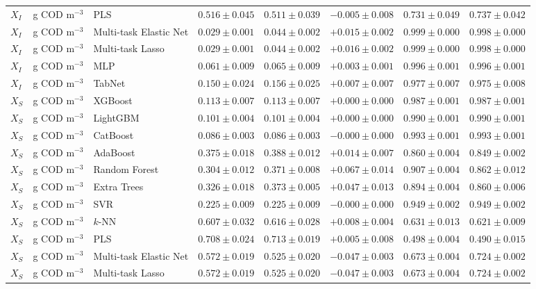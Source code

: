 \begin{longtable}{llp{3.1cm}rrrrr}
$X_{I}$ & g COD m$^{-3}$ & PLS & $0.516\pm0.045$ & $0.511\pm0.039$ & $-0.005\pm0.008$ & $0.731\pm0.049$ & $0.737\pm0.042$ \\
$X_{I}$ & g COD m$^{-3}$ & Multi-task Elastic Net & $0.029\pm0.001$ & $0.044\pm0.002$ & $+0.015\pm0.002$ & $0.999\pm0.000$ & $0.998\pm0.000$ \\
$X_{I}$ & g COD m$^{-3}$ & Multi-task Lasso & $0.029\pm0.001$ & $0.044\pm0.002$ & $+0.016\pm0.002$ & $0.999\pm0.000$ & $0.998\pm0.000$ \\
$X_{I}$ & g COD m$^{-3}$ & MLP & $0.061\pm0.009$ & $0.065\pm0.009$ & $+0.003\pm0.001$ & $0.996\pm0.001$ & $0.996\pm0.001$ \\
$X_{I}$ & g COD m$^{-3}$ & TabNet & $0.150\pm0.024$ & $0.156\pm0.025$ & $+0.007\pm0.007$ & $0.977\pm0.007$ & $0.975\pm0.008$ \\
$X_{S}$ & g COD m$^{-3}$ & XGBoost & $0.113\pm0.007$ & $0.113\pm0.007$ & $+0.000\pm0.000$ & $0.987\pm0.001$ & $0.987\pm0.001$ \\
$X_{S}$ & g COD m$^{-3}$ & LightGBM & $0.101\pm0.004$ & $0.101\pm0.004$ & $+0.000\pm0.000$ & $0.990\pm0.001$ & $0.990\pm0.001$ \\
$X_{S}$ & g COD m$^{-3}$ & CatBoost & $0.086\pm0.003$ & $0.086\pm0.003$ & $-0.000\pm0.000$ & $0.993\pm0.001$ & $0.993\pm0.001$ \\
$X_{S}$ & g COD m$^{-3}$ & AdaBoost & $0.375\pm0.018$ & $0.388\pm0.012$ & $+0.014\pm0.007$ & $0.860\pm0.004$ & $0.849\pm0.002$ \\
$X_{S}$ & g COD m$^{-3}$ & Random Forest & $0.304\pm0.012$ & $0.371\pm0.008$ & $+0.067\pm0.014$ & $0.907\pm0.004$ & $0.862\pm0.012$ \\
$X_{S}$ & g COD m$^{-3}$ & Extra Trees & $0.326\pm0.018$ & $0.373\pm0.005$ & $+0.047\pm0.013$ & $0.894\pm0.004$ & $0.860\pm0.006$ \\
$X_{S}$ & g COD m$^{-3}$ & SVR & $0.225\pm0.009$ & $0.225\pm0.009$ & $-0.000\pm0.000$ & $0.949\pm0.002$ & $0.949\pm0.002$ \\
$X_{S}$ & g COD m$^{-3}$ & $k$-NN & $0.607\pm0.032$ & $0.616\pm0.028$ & $+0.008\pm0.004$ & $0.631\pm0.013$ & $0.621\pm0.009$ \\
$X_{S}$ & g COD m$^{-3}$ & PLS & $0.708\pm0.024$ & $0.713\pm0.019$ & $+0.005\pm0.008$ & $0.498\pm0.004$ & $0.490\pm0.015$ \\
$X_{S}$ & g COD m$^{-3}$ & Multi-task Elastic Net & $0.572\pm0.019$ & $0.525\pm0.020$ & $-0.047\pm0.003$ & $0.673\pm0.004$ & $0.724\pm0.002$ \\
$X_{S}$ & g COD m$^{-3}$ & Multi-task Lasso & $0.572\pm0.019$ & $0.525\pm0.020$ & $-0.047\pm0.003$ & $0.673\pm0.004$ & $0.724\pm0.002$ \\

\end{longtable}
